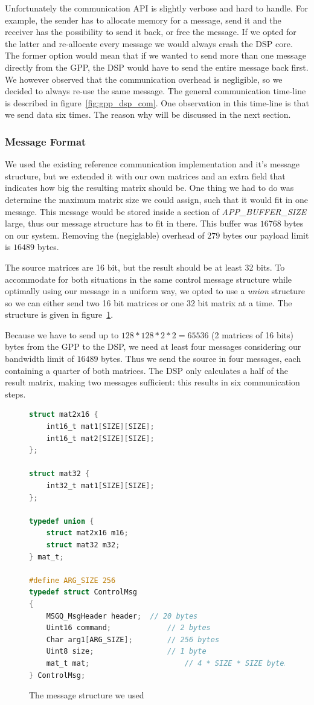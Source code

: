 Unfortunately the communication API is slightly verbose and hard to handle.
For example, the sender has to allocate memory for a message, send it and the
receiver has the possibility to send it back, or free the message. If we opted
for the latter and re-allocate every message we would always crash the DSP core.
The former option would mean that if we wanted to send more than one message
directly from the GPP, the DSP would have to send the entire message back first.
We however observed that the communication overhead is negligible, so we
decided to always re-use the same message. The general communication time-line
is described in figure~\ref{fig:gpp_dsp_com}. One observation in this time-line
is that we send data six times. The reason why will be discussed in the next
section.

\subsubsection{Message Format}
We used the existing reference communication implementation and it's message
structure, but we extended it with our own matrices and an extra field that
indicates how big the resulting matrix should be. One thing we had to do
was determine the maximum matrix size we could assign, such that it would fit
in one message. This message would be stored inside a section of
\emph{APP\_BUFFER\_SIZE} large, thus our message structure has to fit in there.
This buffer was $16768$ bytes on our system.
Removing the (negiglable) overhead of $279$ bytes our payload limit is $16489$ bytes.

The source matrices are 16 bit, but the result should be at least 32 bits.
To accommodate for both
situations in the same control message structure while optimally using our
message in a uniform way, we opted to use a \emph{union} structure so we
can either send two 16 bit matrices or one 32 bit matrix at a time. The
structure is given in figure~\ref{code:control_msg}.

Because we have to send up to $128*128*2*2=65536$ (2 matrices of 16 bits)
bytes from the GPP to the DSP, we need at least four messages considering
our bandwidth limit of $16489$ bytes. Thus we send the source in four messages,
each containing a quarter of both matrices. The DSP only calculates a half of
the result matrix, making two messages sufficient: this results in six
communication steps.

\begin{figure}[h]
\begin{lstlisting}[language=C]
struct mat2x16 {
	int16_t mat1[SIZE][SIZE];
	int16_t mat2[SIZE][SIZE];
};

struct mat32 {
	int32_t mat1[SIZE][SIZE];
};

typedef union {
	struct mat2x16 m16;
	struct mat32 m32;
} mat_t;

#define ARG_SIZE 256
typedef struct ControlMsg
{
    MSGQ_MsgHeader header;	// 20 bytes
    Uint16 command;				// 2 bytes
    Char arg1[ARG_SIZE];		// 256 bytes
    Uint8 size;					// 1 byte
    mat_t mat;						// 4 * SIZE * SIZE bytes
} ControlMsg;
\end{lstlisting}
\caption{The message structure we used}
\label{code:control_msg}
\end{figure}


